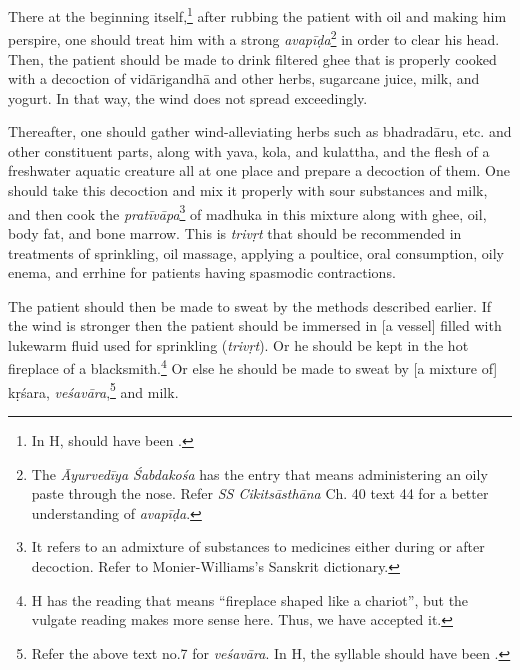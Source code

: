 \begin{translation}
        \newpage
        \begin{tt}
            \raggedright
            \bigskip
            
        
        There at the beginning itself,\footnote{In H, 
            should have been .} after rubbing the patient
            with oil and making him perspire, one should treat him with a
            strong \textit{avapīḍa}\footnote{The \textit{Āyurvedīya
                \'{S}abdakośa} has the entry  that means
                administering an oily paste through the nose. Refer \textit{SS
                    Cikitsāsthāna} Ch. 40 text 44 for a better understanding of
                \textit{avapīḍa}.} in
            order to clear his head. Then, the patient should be made to
            drink filtered ghee that is properly cooked with a decoction
            of \gls{vidārigandhā} and other herbs, sugarcane juice, milk,
            and yogurt. In that way, the wind does not spread exceedingly.

Thereafter, one should gather wind-alleviating herbs such as
\gls{bhadradāru}, etc. and other constituent parts, along with
\gls{yava}, \gls{kola}, and \gls{kulattha}, and the flesh of a
freshwater aquatic creature all at one place and prepare a decoction
of them. One should take this decoction and mix it properly with sour
substances and milk, and then cook the \textit{pratīvāpa}\footnote{It
    refers to an admixture of substances to medicines either during or
    after decoction. Refer to Monier-Williams's Sanskrit dictionary.} of
    \gls{madhuka} in this mixture along with ghee, oil, body fat, and bone
    marrow. This is \textit{trivṛt} that should be recommended in
    treatments of sprinkling, oil massage, applying a poultice, oral
    consumption, oily enema, and errhine for patients having spasmodic
    contractions.

The patient should then be made to sweat by the methods described
earlier. If the wind is stronger then the patient should be immersed
in [a vessel] filled with lukewarm fluid used for sprinkling
(\textit{trivṛt}). Or he should be kept in the hot fireplace of a
blacksmith.\footnote{H has the reading  that
    means \enquote{fireplace shaped like a chariot}, but the vulgate
    reading  makes more sense here. Thus, we have
    accepted it.} Or else he should be made to sweat by [a mixture of]
    \gls{kṛśara}, \textit{veśavāra},\footnote{Refer the above text no.7
        for \textit{veśavāra}. In H, the syllable  should have been
        .} and milk.


\end{tt}
\end{translation}
